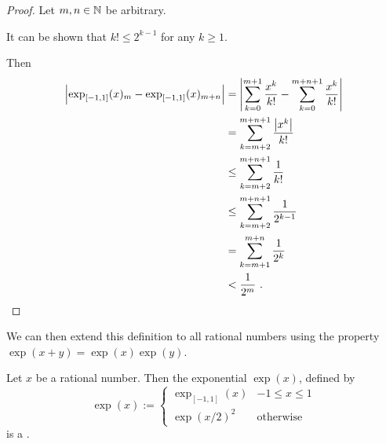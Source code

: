 \documentclass[leqno]{report}
\begin{document}
\begin{proof}
    Let $m, n \in \mathbb{N}$ be arbitrary.

    It can be shown that $k! \leq 2^{k-1}$ for any $k \geq 1$.

    Then
    \begin{align*}
        \left| \exp_{[-1,1]}(x)_m - \exp_{[-1,1]}(x)_{m+n} \right|
        &= \left| \sum_{k=0}^{m+1} \frac{x^k}{k!} - \sum_{k=0}^{m+n+1} \frac{x^k}{k!} \right| \\
        &= \sum_{k=m+2}^{m+n+1} \frac{\left| x^k \right|}{k!} \\
        &\leq \sum_{k=m+2}^{m+n+1} \frac{1}{k!} \\
        &\leq \sum_{k=m+2}^{m+n+1} \frac{1}{2^{k-1}} \\
        &= \sum_{k=m+1}^{m+n} \frac{1}{2^k} \\
        &< \frac{1}{2^m} \ . \qedhere
    \end{align*}
\end{proof}

We can then extend this definition to all rational numbers using the property $\exp(x + y) = \exp(x)\exp(y)$.

\begin{Corollary}[Exponential on $\Q$]
    Let $x$ be a rational number. Then the exponential $\exp(x)$, defined by
    \[
        \exp(x) := \begin{cases}
            \exp_{[-1,1]}(x) & -1 \leq x \leq 1 \\
            \exp(x/2)^2 & \textrm{otherwise}
        \end{cases}
    \]
    is a \FCCS.
\end{Corollary}



\end{document}
